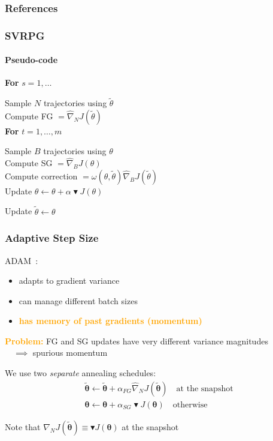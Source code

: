 \documentclass[aspectratio=169]{beamer}
\newcommand{\eno}[1]{\textcolor{orange}{\textbf{#1}}}
\newcommand{\vtheta}{\boldsymbol{\theta}}
\newcommand{\gradBlack}[1]{\blacktriangledown J(#1)}
\begin{document}
\begin{frame}
\frametitle{References}

\end{frame}


\begin{frame} 
\frametitle{SVRPG} 
\framesubtitle{Pseudo-code}

\textbf{For} $s = 1,\ldots$
\vspace*{-.2cm}
\begin{rightbrace2}
	Sample $N$ trajectories using $\widetilde{\theta}$\\
	Compute FG $=\widehat{\nabla}_N J(\widetilde{\theta})$\\
	\textbf{For} $t = 1, \ldots, m$
	\vspace*{-.15cm}
	\begin{rightbrace1}
		Sample $B$ trajectories using $\theta$\\
		Compute SG $=\widehat{\nabla}_B J(\theta)$\\
		Compute correction $=\omega(\theta, \widetilde{\theta})\widehat{\nabla}_B J(\widetilde{\theta})$\\
		Update $\theta\gets\theta+\alpha\gradBlack{\theta}$
	\end{rightbrace1}
	\vspace*{-.15cm}
	Update $\widetilde{\theta}\gets\theta$
\end{rightbrace2}
\vspace*{-.2cm}

\end{frame}

\begin{frame} 
\frametitle{Adaptive Step Size} 
ADAM~\citep{kingma2014adam}:
\begin{itemize}
	\item adapts to gradient variance
	\item can manage different batch sizes
	\item \eno{has memory of past gradients (momentum)}
\end{itemize}
\vfill

\eno{Problem:} FG and SG updates have very different variance magnitudes \\
$\quad\implies$ spurious momentum
\vfill

We use two \textit{separate} annealing schedules:
\begin{align*}
&\widetilde{\vtheta} \gets \widetilde{\vtheta} + \alpha_{FG}\widehat{\nabla}_NJ(\widetilde{\vtheta})\quad\text{at the snapshot}\\ 
&\vtheta \gets \vtheta + \alpha_{SG}\gradBlack{\vtheta}\quad\text{otherwise}
\end{align*}
\vfill

Note that $\widehat{\nabla}_NJ(\widetilde{\vtheta})\equiv\gradBlack{\vtheta}$ at the snapshot

\end{frame}
\end{document}
